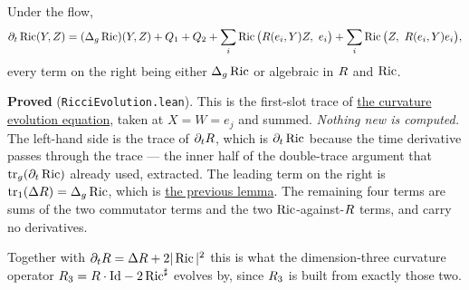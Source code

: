 \begin{lemma}
  \label{lem:evolution-ric}
  \leanok
  Under the flow,
  \[
    \partial_t\operatorname{Ric}(Y,Z) = (\Delta_g\operatorname{Ric})(Y,Z)
      + Q_1 + Q_2
      + \sum_i \operatorname{Ric}\big(R(e_i,Y)Z,\ e_i\big)
      + \sum_i \operatorname{Ric}\big(Z,\ R(e_i,Y)e_i\big),
  \]
  every term on the right being either $\Delta_g\operatorname{Ric}$ or algebraic in $R$ and $\operatorname{Ric}$.

  \textbf{Proved} (\texttt{RicciEvolution.lean}). This is the first-slot trace of
  \hyperref[lem:evolution-rm]{the curvature evolution equation}, taken at $X = W = e_j$ and
  summed. \emph{Nothing new is computed.} The left-hand side is the trace of
  $\partial_tR$, which is $\partial_t\operatorname{Ric}$ because the time derivative passes through the
  trace --- the inner half of the double-trace argument that
  $\operatorname{tr}_g(\partial_t\operatorname{Ric})$ already used, extracted. The leading term on the
  right is $\operatorname{tr}_1(\Delta R) = \Delta_g\operatorname{Ric}$, which is
  \hyperref[lem:curvature-trace-second]{the previous lemma}. The remaining four terms are
  sums of the two commutator terms and the two $\operatorname{Ric}$-against-$R$ terms, and carry no
  derivatives.

  Together with $\partial_t R = \Delta R + 2|\operatorname{Ric}|^2$ this is what the dimension-three
  curvature operator $R_3 = R\cdot\mathrm{Id} - 2\operatorname{Ric}^\sharp$ evolves by, since $R_3$
  is built from exactly those two.
\end{lemma}

